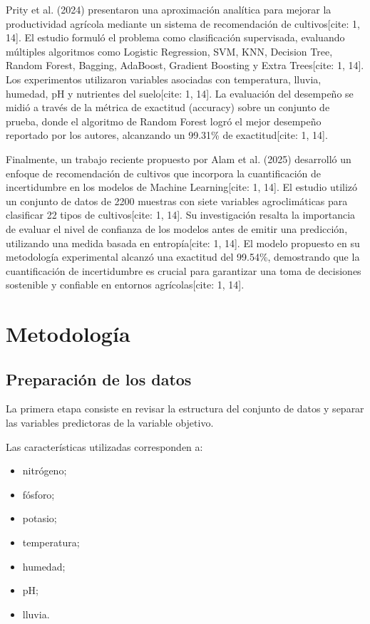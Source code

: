 \documentclass[conference]{IEEEtran}
\begin{document}
Prity et al. (2024) presentaron una aproximación analítica para mejorar la productividad agrícola mediante un sistema de recomendación de cultivos[cite: 1, 14]. El estudio formuló el problema como clasificación supervisada, evaluando múltiples algoritmos como Logistic Regression, SVM, KNN, Decision Tree, Random Forest, Bagging, AdaBoost, Gradient Boosting y Extra Trees[cite: 1, 14]. Los experimentos utilizaron variables asociadas con temperatura, lluvia, humedad, pH y nutrientes del suelo[cite: 1, 14]. La evaluación del desempeño se midió a través de la métrica de exactitud (accuracy) sobre un conjunto de prueba, donde el algoritmo de Random Forest logró el mejor desempeño reportado por los autores, alcanzando un 99.31\% de exactitud[cite: 1, 14].

Finalmente, un trabajo reciente propuesto por Alam et al. (2025) desarrolló un enfoque de recomendación de cultivos que incorpora la cuantificación de incertidumbre en los modelos de Machine Learning[cite: 1, 14]. El estudio utilizó un conjunto de datos de 2200 muestras con siete variables agroclimáticas para clasificar 22 tipos de cultivos[cite: 1, 14]. Su investigación resalta la importancia de evaluar el nivel de confianza de los modelos antes de emitir una predicción, utilizando una medida basada en entropía[cite: 1, 14]. El modelo propuesto en su metodología experimental alcanzó una exactitud del 99.54\%, demostrando que la cuantificación de incertidumbre es crucial para garantizar una toma de decisiones sostenible y confiable en entornos agrícolas[cite: 1, 14].


\section{Metodología}

\subsection{Preparación de los datos}

La primera etapa consiste en revisar la estructura del conjunto de datos y separar las variables predictoras de la variable objetivo.

Las características utilizadas corresponden a:

\begin{itemize}
    \item nitrógeno;
    \item fósforo;
    \item potasio;
    \item temperatura;
    \item humedad;
    \item pH;
    \item lluvia.
\end{itemize}
\end{document}
